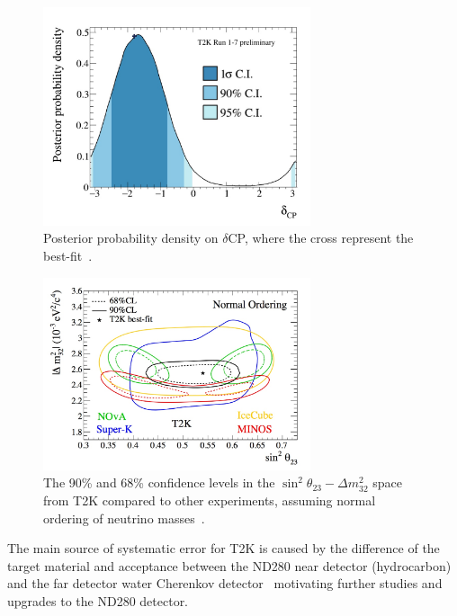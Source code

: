 \begin{figure}[h!]
\centering
  \centering
\includegraphics[width=0.7\textwidth]{figures/t2k1.jpeg}
\vspace{2mm}
\caption{Posterior probability density on $\delta$CP, where the cross represent the best-fit~\cite{T2Kfigures}.}
\label{fig:T2KCP}
\end{figure}

\begin{figure}[h!]
\centering
  \centering
\includegraphics[width=0.7\textwidth]{figures/t2k2.jpeg}
\vspace{2mm}
\caption{The 90\% and 68\% confidence levels in the $\sin ^2 \theta_{23}-\Delta m^2_{32}$ space from T2K compared to other experiments, assuming normal ordering of neutrino masses~\cite{T2Kfigures}.}
\label{fig:T2K23}
\end{figure}

The main source of systematic error for T2K is caused by the difference of the target material and acceptance between the ND280 near detector (hydrocarbon) and the far detector water Cherenkov detector~\cite{T2Kpaper} motivating further studies and upgrades to the ND280 detector.

